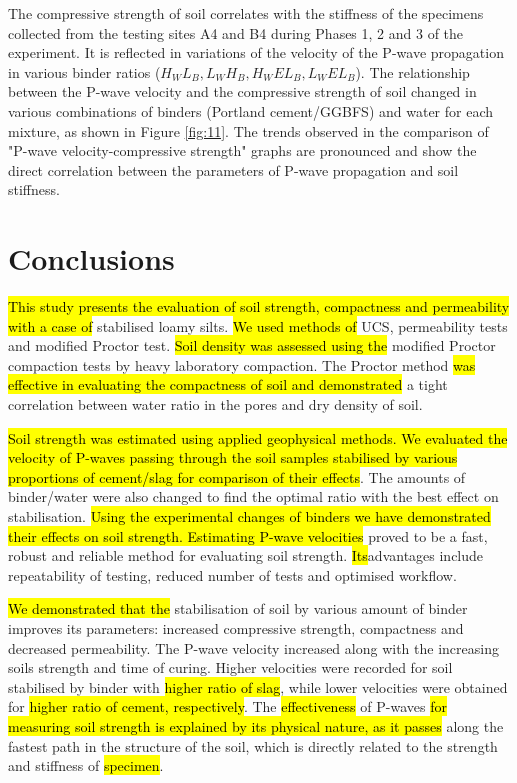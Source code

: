 \documentclass{amestyle}
\begin{document}
The compressive strength of soil correlates with the stiffness of the specimens collected from the testing sites A4 and B4 during Phases 1, 2 and 3 of the experiment. It is reflected in variations of the velocity of the P-wave propagation in various binder ratios ($H_WL_B, L_WH_B, H_WEL_B, L_WEL_B$). The relationship between the P-wave velocity and the compressive strength of soil changed in various combinations of binders (Portland cement/GGBFS) and water for each mixture, as shown in Figure \ref{fig:11}. The trends observed in the comparison of "P-wave velocity-compressive strength" graphs are pronounced and show the direct correlation between the parameters of P-wave propagation and soil stiffness. 

\section{Conclusions}
\label{sec:conclusions}

\hl{This study presents the evaluation of soil strength, compactness and permeability with a case of } stabilised loamy silts. \hl{We used methods of} UCS, permeability tests and modified Proctor test. \hl{Soil density was assessed using the} modified Proctor compaction tests by heavy laboratory compaction. The Proctor method \hl{was effective in evaluating the compactness of soil and demonstrated} a tight correlation between water ratio in the pores and dry density of soil. 

\hl{Soil strength was estimated using applied geophysical methods. We evaluated the velocity of P-waves passing through the soil samples stabilised by various proportions of cement/slag for comparison of their effects}. The amounts of binder/water were also changed to find the optimal ratio with the best effect on stabilisation. \hl{Using the experimental changes of binders we have demonstrated their effects on soil strength. Estimating P-wave velocities} proved to be a fast, robust and reliable method for evaluating soil strength. \hl{Its}advantages include repeatability of testing, reduced number of tests and optimised workflow. 

\hl{We demonstrated that the} stabilisation of soil by various amount of binder improves its parameters: increased compressive strength, compactness and decreased permeability. The P-wave velocity increased along with the increasing soils strength and time of curing. Higher velocities were recorded for soil stabilised by binder with \hl{higher ratio of slag}, while lower velocities were obtained for \hl{higher ratio of cement, respectively}. The \hl{effectiveness} of P-waves \hl{for measuring soil strength is explained by its physical nature, as it passes} along the fastest path in the structure of the soil, which is directly related to the strength and stiffness of \hl{specimen}. 
\end{document}
